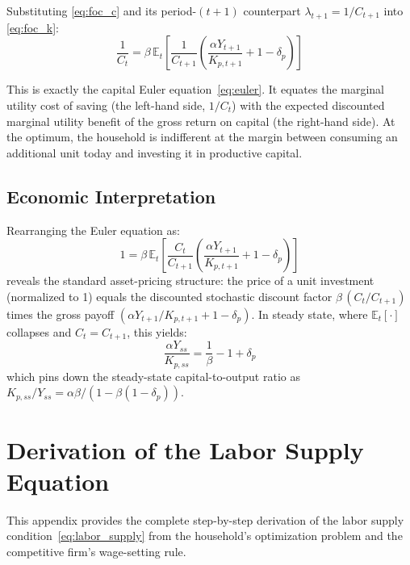 \documentclass[12pt, a4paper]{article}
\begin{document}
Substituting \eqref{eq:foc_c} and its period-$(t+1)$ counterpart $\lambda_{t+1} = 1/C_{t+1}$ into \eqref{eq:foc_k}:
\begin{equation*}
\frac{1}{C_t} = \beta\,\mathbb{E}_t\!\left[\frac{1}{C_{t+1}}
\left(\frac{\alpha Y_{t+1}}{K_{p,t+1}} + 1 - \delta_p\right)\right]
\end{equation*}

This is exactly the capital Euler equation~\eqref{eq:euler}. It equates the marginal utility cost of saving (the left-hand side, $1/C_t$) with the expected discounted marginal utility benefit of the gross return on capital (the right-hand side). At the optimum, the household is indifferent at the margin between consuming an additional unit today and investing it in productive capital.

\subsection*{Economic Interpretation}

Rearranging the Euler equation as:
\begin{equation*}
1 = \beta\,\mathbb{E}_t\!\left[\frac{C_t}{C_{t+1}}
\left(\frac{\alpha Y_{t+1}}{K_{p,t+1}} + 1 - \delta_p\right)\right]
\end{equation*}
reveals the standard asset-pricing structure: the price of a unit investment (normalized to 1) equals the discounted stochastic discount factor $\beta\,(C_t/C_{t+1})$ times the gross payoff $(\alpha Y_{t+1}/K_{p,t+1} + 1 - \delta_p)$. In steady state, where $\mathbb{E}_t[\cdot]$ collapses and $C_t = C_{t+1}$, this yields:
\begin{equation*}
\frac{\alpha Y_{ss}}{K_{p,ss}} = \frac{1}{\beta} - 1 + \delta_p
\end{equation*}
which pins down the steady-state capital-to-output ratio as $K_{p,ss}/Y_{ss} = \alpha\beta/(1 - \beta(1-\delta_p))$.

\section{Derivation of the Labor Supply Equation} \label{app:deriv_labor}

This appendix provides the complete step-by-step derivation of the labor supply condition~\eqref{eq:labor_supply} from the household's optimization problem and the competitive firm's wage-setting rule.
\end{document}
